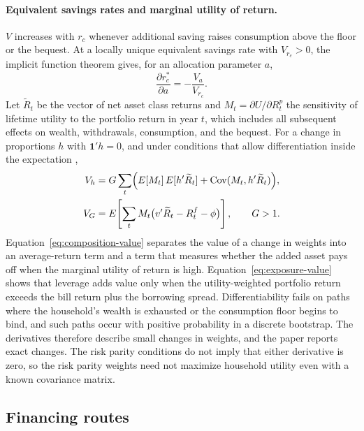 \paragraph{Equivalent savings rates and marginal utility of return.}
$V$ increases with $r_c$ whenever additional saving raises consumption above the floor or the bequest. At
a locally unique equivalent savings rate with $V_{r_c}>0$, the implicit function theorem gives, for an
allocation parameter $a$,
\begin{equation}
 \frac{\partial r_c^*}{\partial a}=-\frac{V_a}{V_{r_c}}.
 \label{eq:saving-gradient}
\end{equation}
Let $\widetilde R_{t}$ be the vector of net asset class returns and $M_t=\partial U/\partial R^p_t$ the
sensitivity of lifetime utility to the portfolio return in year $t$, which includes all subsequent effects
on wealth, withdrawals, consumption, and the bequest. For a change in proportions $h$ with $\mathbf1'h=0$,
and under conditions that allow differentiation inside the expectation \citep{Glasserman1991},
\begin{align}
 V_h&=G\sum_t\Bigl(E[M_t]\,E[h'\widetilde R_t]+\mathrm{Cov}(M_t,h'\widetilde R_t)\Bigr),
 \label{eq:composition-value}\\
 V_G&=E\!\left[\sum_t M_t\bigl(v'\widetilde R_t-R^f_t-\phi\bigr)\right],\qquad G>1.
 \label{eq:exposure-value}
\end{align}
Equation~\eqref{eq:composition-value} separates the value of a change in weights into an average-return
term and a term that measures whether the added asset pays off when the marginal utility of return is
high. Equation~\eqref{eq:exposure-value} shows that leverage adds value only when the utility-weighted
portfolio return exceeds the bill return plus the borrowing spread. Differentiability fails on paths where
the household's wealth is exhausted or the consumption floor begins to bind, and such paths occur with
positive probability in a discrete bootstrap. The derivatives therefore describe small changes in weights,
and the paper reports exact changes. The risk parity conditions do not imply that either derivative is
zero, so the risk parity weights need not maximize household utility even with a known covariance matrix.

\subsection{Financing routes}
\label{app:funding-routes}\label{app:implementation}


